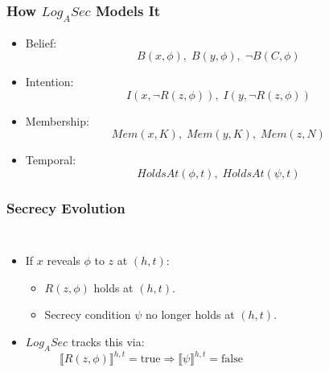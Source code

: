 \documentclass[aspectratio=169]{beamer}
\begin{document}
\begin{frame}
\frametitle{How $Log_ASec$ Models It}
\begin{itemize}
    \Large 
    \item Belief:
    \[
    B(x, \phi), \; B(y, \phi), \; \neg B(C, \phi)
    \]
    \item Intention:
    \[
    I(x, \neg R(z, \phi)), \; I(y, \neg R(z, \phi))
    \]
    \item Membership:
    \[
    Mem(x, K), \; Mem(y, K), \; Mem(z, N)
    \]
    \item Temporal:
    \[
    HoldsAt(\phi, t), \; HoldsAt(\psi, t)
    \]
\end{itemize}
\end{frame}

\begin{frame}
\frametitle{Secrecy Evolution}

\begin{columns}[c]


\Large
\begin{itemize}
    \item If $x$ reveals $\phi$ to $z$ at $(h,t)$:
    \begin{itemize}
        \item $R(z, \phi)$ holds at $(h,t)$.
        \item Secrecy condition $\psi$ no longer holds at $(h,t)$.
    \end{itemize}
    \item $Log_ASec$ tracks this via:
    \[
    \llbracket R(z, \phi) \rrbracket^{h,t} = \text{true}
    \Longrightarrow 
    \llbracket \psi \rrbracket^{h,t} = \text{false}
    \]
\end{itemize}



\end{columns}
\end{frame}
\end{document}
